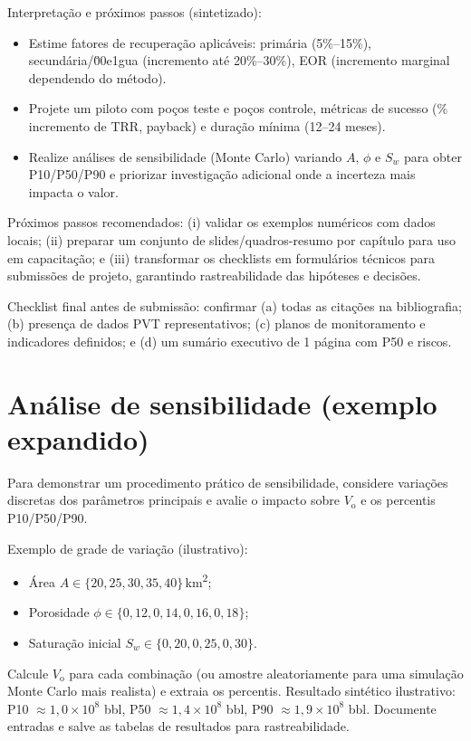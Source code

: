\documentclass[
  12pt,
  a4paper,
  oneside,
  brazilian,
  sumario=tradicional
]{abntex2}
\begin{document}
Interpretação e próximos passos (sintetizado):
\begin{itemize}
  \item Estime fatores de recuperação aplicáveis: primária (5\%--15\%), secundária/\u00e1gua (incremento até 20\%--30\%), EOR (incremento marginal dependendo do método).
  \item Projete um piloto com poços teste e poços controle, métricas de sucesso (\% incremento de TRR, payback) e duração mínima (12--24 meses).
  \item Realize análises de sensibilidade (Monte Carlo) variando $A$, $\phi$ e $S_{w}$ para obter P10/P50/P90 e priorizar investigação adicional onde a incerteza mais impacta o valor.
\end{itemize}

Próximos passos recomendados: (i) validar os exemplos numéricos com dados locais; (ii) preparar um conjunto de slides/quadros-resumo por capítulo para uso em capacitação; e (iii) transformar os checklists em formulários técnicos para submissões de projeto, garantindo rastreabilidade das hipóteses e decisões.

Checklist final antes de submissão: confirmar (a) todas as citações na bibliografia; (b) presença de dados PVT representativos; (c) planos de monitoramento e indicadores definidos; e (d) um sumário executivo de 1 página com P50 e riscos.

\section{Análise de sensibilidade (exemplo expandido)}
Para demonstrar um procedimento prático de sensibilidade, considere variações discretas dos parâmetros principais e avalie o impacto sobre $V_{\mathrm{o}}$ e os percentis P10/P50/P90.

Exemplo de grade de variação (ilustrativo):
\begin{itemize}
  \item Área $A\in\{20,25,30,35,40\}\,$km\textsuperscript{2};
  \item Porosidade $\phi\in\{0{,}12,0{,}14,0{,}16,0{,}18\}$;
  \item Saturação inicial $S_{w}\in\{0{,}20,0{,}25,0{,}30\}$.
\end{itemize}

Calcule $V_{\mathrm{o}}$ para cada combinação (ou amostre aleatoriamente para uma simulação Monte Carlo mais realista) e extraia os percentis. Resultado sintético ilustrativo: P10 $\approx1{,}0\times10^{8}$ bbl, P50 $\approx1{,}4\times10^{8}$ bbl, P90 $\approx1{,}9\times10^{8}$ bbl. Documente entradas e salve as tabelas de resultados para rastreabilidade.
\end{document}
